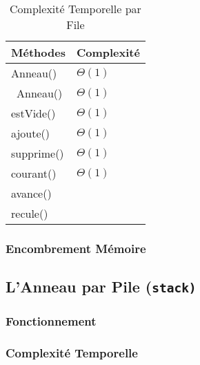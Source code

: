 \documentclass{article}
\newcommand{\info}{\texttt}
\begin{document}
        \begin{table}[H]
        \centering
        \caption{Complexité Temporelle par File}
        \label{ComplexiteFile}
        \begin{tabular}{|l|l|}
        \hline
        \rowcolor[HTML]{C0C0C0} 
        {\color[HTML]{333333} \textbf{Méthodes}} & \textbf{Complexité} \\ \hline
        Anneau()                                 &  $\Theta(1)$                   \\ \hline
        ~Anneau()                                &  $\Theta(1)$                   \\ \hline
        estVide()                                &  $\Theta(1)$                   \\ \hline
        ajoute()                                 &  $\Theta(1)$                   \\ \hline
        supprime()                               &  $\Theta(1)$                   \\ \hline
        courant()                                &  $\Theta(1)$                   \\ \hline
        avance()                                 &                     \\ \hline
        recule()                                 &                     \\ \hline
        \end{tabular}
        \end{table}
        
        \subsubsection{Encombrement Mémoire}
    
    \subsection{L'Anneau par Pile (\info{stack)}}
    
        \subsubsection{Fonctionnement}
        
        \subsubsection{Complexité Temporelle}
        
\end{document}
